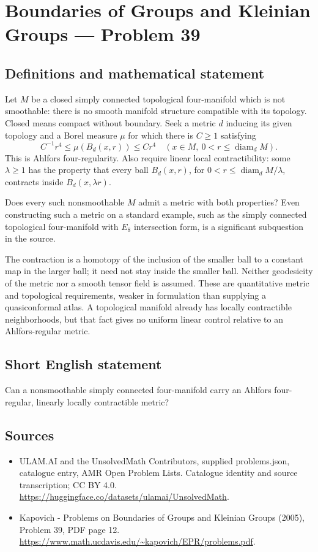 \documentclass[11pt,a4paper]{article}
\begin{document}
\section*{Boundaries of Groups and Kleinian Groups — Problem 39}\label{statement}

\subsection{Definitions and mathematical statement}
Let $M$ be a closed simply connected topological four-manifold which is not smoothable: there is no smooth manifold structure compatible with its topology. Closed means compact without boundary. Seek a metric $d$ inducing its given topology and a Borel measure $\mu$ for which there is $C\geq1$ satisfying
\[
 C^{-1}r^4\leq\mu(B_d(x,r))\leq Cr^4
 \quad(x\in M,\ 0<r\leq\operatorname{diam}_dM).
\]
This is Ahlfors four-regularity. Also require linear local contractibility: some $\lambda\geq1$ has the property that every ball $B_d(x,r)$, for $0<r\leq\operatorname{diam}_dM/\lambda$, contracts inside $B_d(x,\lambda r)$.

Does every such nonsmoothable $M$ admit a metric with both properties? Even constructing such a metric on a standard example, such as the simply connected topological four-manifold with $E_8$ intersection form, is a significant subquestion in the source.

The contraction is a homotopy of the inclusion of the smaller ball to a constant map in the larger ball; it need not stay inside the smaller ball. Neither geodesicity of the metric nor a smooth tensor field is assumed. These are quantitative metric and topological requirements, weaker in formulation than supplying a quasiconformal atlas. A topological manifold already has locally contractible neighborhoods, but that fact gives no uniform linear control relative to an Ahlfors-regular metric.
\subsection{Short English statement}
Can a nonsmoothable simply connected four-manifold carry an Ahlfors four-regular, linearly locally contractible metric?
\subsection{Sources}
\begin{itemize}
\item[S1] ULAM.AI and the UnsolvedMath Contributors, supplied problems.json, catalogue entry, AMR Open Problem Lists. Catalogue identity and source transcription; CC BY 4.0.
\url{https://huggingface.co/datasets/ulamai/UnsolvedMath}.
\item[S2] Kapovich - Problems on Boundaries of Groups and Kleinian Groups (2005), Problem 39, PDF page 12. 
\url{https://www.math.ucdavis.edu/~kapovich/EPR/problems.pdf}.
\end{itemize}
\end{document}
